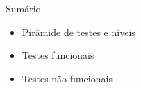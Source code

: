 
\begin{frame}{Sumário}
    \begin{itemize}
        \item Pirâmide de testes e níveis
        \item Testes funcionais
        \item Testes não funcionais
    \end{itemize}
\end{frame}